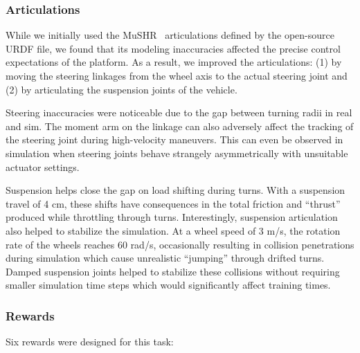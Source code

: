 \begin{appendices}
\subsubsection{Articulations}

While we initially used the MuSHR~\cite{srinivasa_mushr_2023} articulations defined by the open-source URDF file, we found that its modeling inaccuracies affected the precise control expectations of the platform.
As a result, we improved the articulations: (1) by moving the steering linkages from the wheel axis to the actual steering joint and (2) by articulating the suspension joints of the vehicle.

Steering inaccuracies were noticeable due to the gap between turning radii in real and sim. The moment arm on the linkage can also adversely affect the tracking of the steering joint during high-velocity maneuvers. This can even be observed in simulation when steering joints behave strangely asymmetrically with unsuitable actuator settings.

Suspension helps close the gap on load shifting during turns. With a suspension travel of 4 cm, these shifts have consequences in the total friction and ``thrust'' produced while throttling through turns. Interestingly, suspension articulation also helped to stabilize the simulation. At a wheel speed of 3 m/s, the rotation rate of the wheels reaches 60 rad/s, occasionally resulting in collision penetrations during simulation which cause unrealistic ``jumping'' through drifted turns. Damped suspension joints helped to stabilize these collisions without requiring smaller simulation time steps which would significantly affect training times.

\subsubsection{Rewards}

Six rewards were designed for this task:


\end{appendices}
